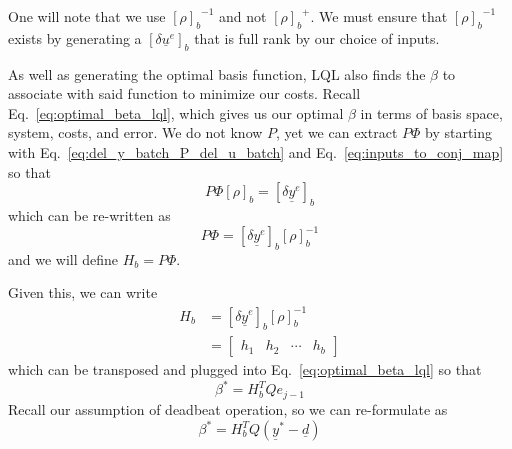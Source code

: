 One will note that we use ${{\left[\rho\right]}_b}^{-1}$ and not ${{\left[\rho\right]}_b}^+$. We must ensure that ${{\left[\rho\right]}_b}^{-1}$ exists by generating a ${\left[\delta\underline{u}^e\right]}_b$ that is full rank by our choice of inputs.

As well as generating the optimal basis function, LQL also finds the $\beta$ to associate with said function to minimize our costs. Recall Eq.~\ref{eq:optimal_beta_lql}, which gives us our optimal $\beta$ in terms of basis space, system, costs, and error. We do not know $P$, yet we can extract $P\Phi$ by starting with Eq.~\ref{eq:del_y_batch_P_del_u_batch} and Eq.~\ref{eq:inputs_to_conj_map} so that
\begin{equation}
    P \Phi {\left[\rho\right]}_b = {\left[\delta\underline{y}^e\right]}_b
\end{equation}
which can be re-written as
\begin{equation}
    P \Phi = {\left[\delta\underline{y}^e\right]}_b {\left[\rho\right]}_b^{-1}
\end{equation}
and we will define $H_b = P \Phi$. 

Given this, we can write
\begin{equation}
    \begin{split}
        H_b &= {\left[\delta\underline{y}^e\right]}_b {\left[\rho\right]}_b^{-1} \\
        &= \begin{bmatrix}
            h_1 & h_2 & \cdots & h_b
        \end{bmatrix}
    \end{split}
    \label{eq:batch_Hb}
\end{equation}
which can be transposed and plugged into Eq.~\ref{eq:optimal_beta_lql} so that
\begin{equation}
    \beta^\ast = H_b^T Q e_{j-1}
    \label{eq:beta_batch}
\end{equation}
Recall our assumption of deadbeat operation, so we can re-formulate as
\begin{equation}
    \beta^\ast = H_b^T Q (\underline{y}^\ast - \underline{d})
\end{equation}

